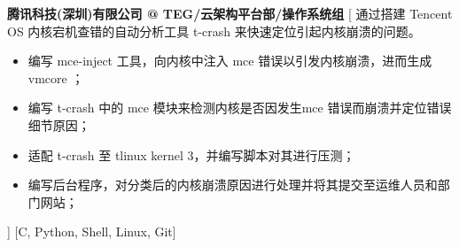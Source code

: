\begin{experiences}
	{\textbf{腾讯科技(深圳)有限公司 @ TEG/云架构平台部/操作系统组}}%
	[
	通过搭建 Tencent OS 内核宕机查错的自动分析工具 t-crash 来快速定位引起内核崩溃的问题。
	\begin{itemize}
		\item {编写 mce-inject 工具，向内核中注入 mce 错误以引发内核崩溃，进而生成 vmcore ；}
		\item {编写 t-crash 中的 mce 模块来检测内核是否因发生mce 错误而崩溃并定位错误细节原因；}
		\item {适配 t-crash 至 tlinux kernel 3，并编写脚本对其进行压测；}
		\item {编写后台程序，对分类后的内核崩溃原因进行处理并将其提交至运维人员和部门网站；}
	\end{itemize}
	]
	[C, Python, Shell, Linux, Git]
	
\end{experiences}
